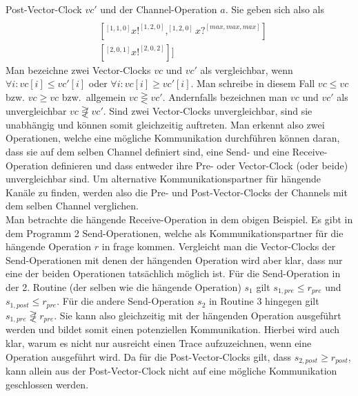 Post-Vector-Clock $vc'$ und der Channel-Operation $a$. Sie geben sich also als
\begin{align*}
  [&[^{[2,0,0]}x?^{[3,0,2]}, ^{[3,0,2]}x?^{[4,2,2]}]\\
  &[^{[1, 1, 0]}x!^{[1, 2, 0]}, ^{[1, 2, 0]}x?^{[max, max, max]}]\\
  &[^{[2, 0, 1]}x!^{[2, 0, 2]}]]
\end{align*}
Man bezeichne zwei Vector-Clocks $vc$ und $vc'$ als vergleichbar, wenn
$\forall i: vc[i] \leq vc'[i]$ oder $\forall i: vc[i] \geq vc'[i]$. Man 
schreibe in diesem Fall $vc \leq vc$ bzw. $vc \geq vc$ bzw.~allgemein 
$vc \gtreqless vc'$. Andernfalls 
bezeichnen man $vc$ und $vc'$ als unvergleichbar $vc \not\gtreqless vc'$. 
Sind zwei Vector-Clocks 
unvergleichbar, sind sie unabhängig und können somit gleichzeitig auftreten. 
Man erkennt also zwei Operationen, welche eine mögliche Kommunikation durchführen 
können daran, dass sie auf dem selben Channel definiert sind, eine Send-
und eine Receive-Operation definieren und dass 
entweder ihre Pre- oder Vector-Clock (oder beide) unvergleichbar sind.
Um alternative Kommunikationspartner für hängende Kanäle zu finden, werden also
die Pre- und Post-Vector-Clocks der Channels mit dem selben Channel verglichen.\\
Man betrachte die hängende Receive-Operation in dem obigen Beispiel. Es gibt 
in dem Programm 2 Send-Operationen, welche als Kommunikationspartner für 
die hängende Operation $r$ in frage kommen. Vergleicht man die Vector-Clocks der 
Send-Operationen mit denen der hängenden Operation wird aber klar, dass nur 
eine der beiden Operationen tatsächlich möglich ist. Für die Send-Operation 
in der 2. Routine (der selben wie die hängende Operation) $s_1$ gilt 
$s_{1, pre} \leq r_{pre}$ und $s_{1, post} \leq r_{pre}$.  
Für die andere Send-Operation $s_2$ in Routine 3 hingegen gilt 
$s_{1, pre} \not\gtreqless r_{pre}$. Sie kann also gleichzeitig mit der 
hängenden Operation ausgeführt werden und bildet somit einen potenziellen 
Kommunikation. Hierbei wird auch klar, warum es nicht nur ausreicht einen 
Trace aufzuzeichnen, wenn eine Operation ausgeführt wird. Da für die 
Post-Vector-Clocks gilt, dass $s_{2, post} \geq r_{post}$, kann allein aus der 
Post-Vector-Clock nicht auf eine mögliche Kommunikation geschlossen werden.

